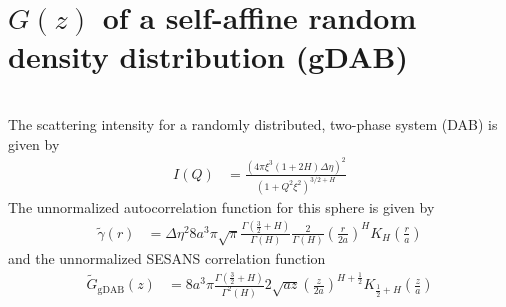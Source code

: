 \section{$G(z)$ of a self-affine random density distribution (gDAB) }~\\
The scattering intensity for a randomly distributed, two-phase system (DAB) is given by \cite{Klimes2002,Hunter2006,Andersson2008}
\begin{align}
I(Q) &= \frac{\left(4 \pi \xi^3 (1+2H) \Delta\eta\right)^2}{ \left(1+Q^2\xi^2\right)^{3/2+H}}
\end{align}
The unnormalized autocorrelation function for this sphere is given by
\begin{align}
\tilde{\gamma}(r) &=
 \Delta\eta^2 8a^3\pi\sqrt{\pi}\frac{\Gamma\left(\frac{3}{2}+H\right)}{\Gamma\left(H\right)}\frac{2}{\Gamma(H)}\left(\frac{r}{2a}\right)^H K_H\left(\frac{r}{a}\right)
\end{align}
and the unnormalized SESANS correlation function
\begin{align}
\tilde{G}_\mathrm{gDAB}(z)&=  8a^3\pi\frac{\Gamma\left(\frac{3}{2}+H\right)}{\Gamma^2\left(H\right)} 2\sqrt{az}\left(\frac{z}{2a}\right)^{H+\frac12}K_{\frac12+H}\left(\frac{z}{a}\right)
\end{align}


